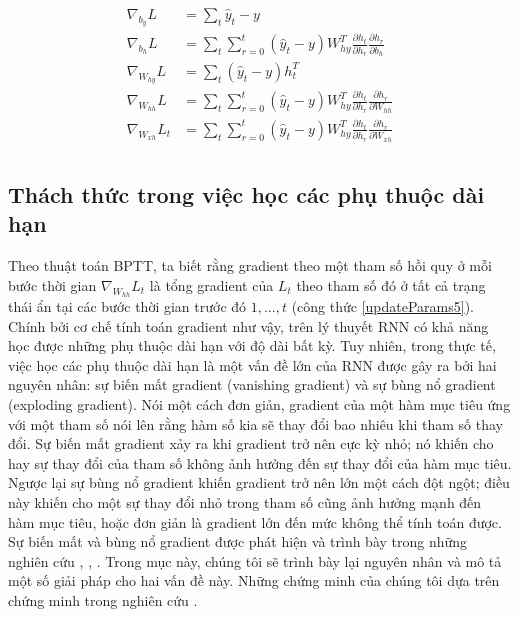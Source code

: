 \begin{align}
	\nabla_{b_{y}}L &= \sum_{t} \hat{y}_t - y \\ \label{updateParams2} 
    \nabla_{b_h}L &= \sum_{t} \sum_{r=0}^{t} (\hat{y}_t - y) W_{hy}^T \frac{\partial h_{t}}{\partial h_r} \frac{\partial h_r}{\partial b_h} \\ \label{updateParams3}
    \nabla_{W_{hy}}L &= \sum_{t} (\hat{y}_t - y) h_t^T \\ \label{updateParams4}
    \nabla_{W_{hh}}L &= \sum_{t} \sum_{r=0}^{t}  (\hat{y}_t - y) W_{hy}^T \frac{\partial h_{t}}{\partial h_r} \frac{\partial h_r}{\partial W_{hh}} \\ \label{updateParams5}
    \nabla_{W_{xh}}L_t &= \sum_{t} \sum_{r=0}^{t} (\hat{y}_t - y) W_{hy}^T \frac{\partial h_{t}}{\partial h_r} \frac{\partial h_r}{\partial W_{xh}} \\ \label{updateParams6} \nonumber
\end{align}

\subsection{Thách thức trong việc học các phụ thuộc dài hạn}

Theo thuật toán BPTT, ta biết rằng gradient theo một tham số hồi quy ở mỗi bước thời gian $\nabla_{W_{hh}} L_t$ là tổng gradient của $L_t$ theo tham số đó ở tất cả trạng thái ẩn tại các bước thời gian trước đó $1,...,t$ (công thức \ref{updateParams5}). Chính bởi cơ chế tính toán gradient như vậy, trên lý thuyết RNN có khả năng học được những phụ thuộc dài hạn với độ dài bất kỳ. Tuy nhiên, trong thực tế, việc học các phụ thuộc dài hạn là một vấn đề lớn của RNN được gây ra bởi hai nguyên nhân: sự biến mất gradient (vanishing gradient) và sự bùng nổ gradient (exploding gradient). Nói một cách đơn giản, gradient của một hàm mục tiêu ứng với một tham số nói lên rằng hàm số kia sẽ thay đổi bao nhiêu khi tham số thay đổi. Sự biến mất gradient xảy ra khi gradient trở nên cực kỳ nhỏ; nó khiến cho hay sự thay đổi của tham số không ảnh hưởng đến sự thay đổi của hàm mục tiêu. Ngược lại sự bùng nổ gradient khiến gradient trở nên lớn một cách đột ngột; điều này khiến cho một sự thay đổi nhỏ trong tham số cũng ảnh hưởng mạnh đến hàm mục tiêu, hoặc đơn giản là gradient lớn đến mức không thể tính toán được. Sự biến mất và bùng nổ gradient được phát hiện và trình bày trong những nghiên cứu \cite{hochreiter1997}, \cite{bengio1994}, \cite{pascanu2011}. Trong mục này, chúng tôi sẽ trình bày lại nguyên nhân và mô tả một số giải pháp cho hai vấn đề này. Những chứng minh của chúng tôi dựa trên chứng minh trong nghiên cứu \cite{pascanu2011}.

